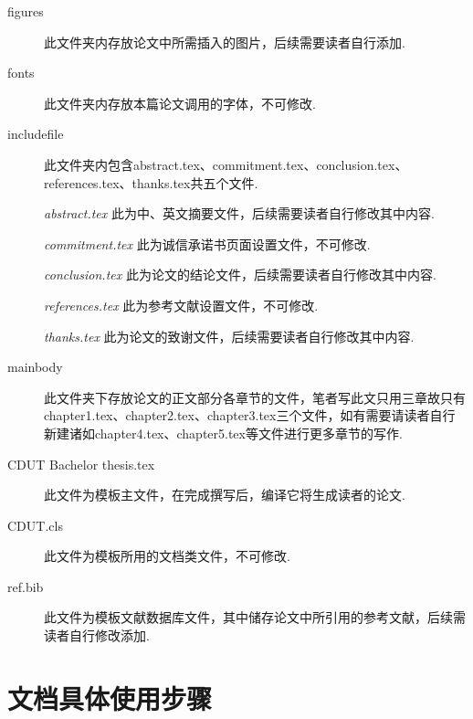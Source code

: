 \begin{description}
  \item[figures]  此文件夹内存放论文中所需插入的图片，后续需要读者自行添加.

  \item[fonts]  此文件夹内存放本篇论文调用的字体，不可修改.

  \item[includefile]  此文件夹内包含abstract.tex、commitment.tex、conclusion.tex、references.tex、thanks.tex共五个文件.\par
  \textit{abstract.tex}  此为中、英文摘要文件，后续需要读者自行修改其中内容.\par
  \textit{commitment.tex}  此为诚信承诺书页面设置文件，不可修改.\par
  \textit{conclusion.tex}  此为论文的结论文件，后续需要读者自行修改其中内容.\par
  \textit{references.tex}  此为参考文献设置文件，不可修改.\par
  \textit{thanks.tex}  此为论文的致谢文件，后续需要读者自行修改其中内容.
  
  \item[mainbody]  此文件夹下存放论文的正文部分各章节的文件，笔者写此文只用三章故只有chapter1.tex、chapter2.tex、chapter3.tex三个文件，如有需要请读者自行新建诸如chapter4.tex、chapter5.tex等文件进行更多章节的写作.
  
  \item[CDUT Bachelor thesis.tex]  此文件为模板主文件，在完成撰写后，编译它将生成读者的论文.
  
  \item[CDUT.cls]  此文件为模板所用的文档类文件，不可修改.
  
  \item[ref.bib]  此文件为模板文献数据库文件，其中储存论文中所引用的参考文献，后续需读者自行修改添加.
\end{description}

\section{文档具体使用步骤}

